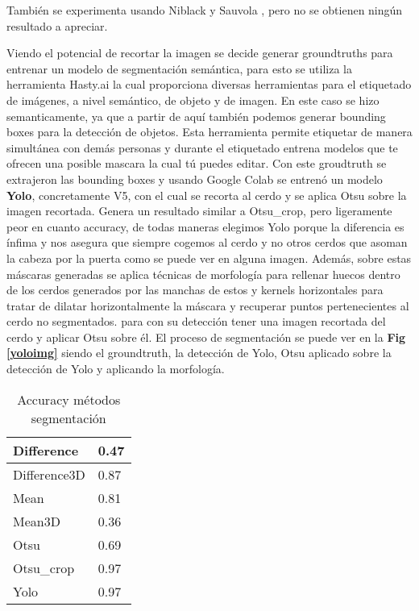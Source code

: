 \documentclass[12pt,a4paper]{article}
\begin{document}
También se experimenta usando Niblack y Sauvola \cite{Niblack}, pero no se obtienen ningún resultado a apreciar.

Viendo el potencial de recortar la imagen se decide generar groundtruths para entrenar un modelo de segmentación semántica, para esto se utiliza la herramienta Hasty.ai \cite{hasty} la cual proporciona diversas herramientas para el etiquetado de imágenes, a nivel semántico, de objeto y de imagen. En este caso se hizo semanticamente, ya que a partir de aquí también podemos generar bounding boxes para la detección de objetos. Esta herramienta permite etiquetar de manera simultánea con demás personas y durante el etiquetado entrena modelos que te ofrecen una posible mascara la cual tú puedes editar. Con este groudtruth se extrajeron las bounding boxes y usando Google Colab se entrenó un modelo \textbf{Yolo}\cite{yolo}, concretamente V5, con el cual se recorta al cerdo y se aplica Otsu sobre la imagen recortada. Genera un resultado similar a Otsu\_crop, pero ligeramente peor en cuanto accuracy, de todas maneras elegimos Yolo porque la diferencia es ínfima y nos asegura que siempre cogemos al cerdo y no otros cerdos que asoman la cabeza por la puerta como se puede ver en alguna imagen. Además, sobre estas máscaras generadas se aplica técnicas de morfología para rellenar huecos dentro de los cerdos generados por las manchas de estos y kernels horizontales para tratar de dilatar horizontalmente la máscara y recuperar puntos pertenecientes al cerdo no segmentados. \cite{yolo} para con su detección tener una imagen recortada del cerdo y aplicar Otsu sobre él. El proceso de segmentación se puede ver en la \textbf{Fig \ref{yoloimg}} siendo \textbf{} el groundtruth, \textbf{} la detección de Yolo, \textbf{} Otsu aplicado sobre la detección de Yolo y \textbf{} aplicando la morfología.

  \begin{table}[!]
\centering
\begin{tabular}{|l|l|}
\hline
Difference   & 0.47 \\ \hline
Difference3D & 0.87 \\ \hline
Mean         & 0.81 \\ \hline
Mean3D       & 0.36 \\ \hline
Otsu         & 0.69 \\ \hline
Otsu\_crop   & 0.97 \\ \hline
Yolo         & 0.97 \\ \hline
\end{tabular}
\caption{Accuracy métodos segmentación}
\label{acc}
\end{table}
\end{document}
